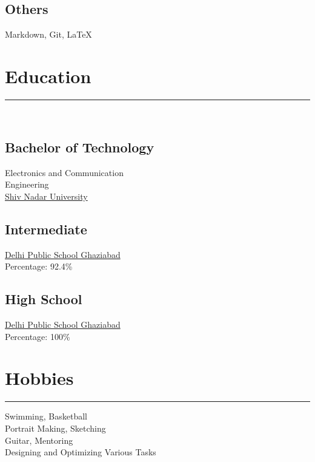 \documentclass[]{rahulworld-resume}
\begin{document}
\begin{minipage}[t]{0.33\textwidth}
\vspace{6pt}
\subsection{Others}
Markdown, Git, LaTeX
\sectionsep

\section{Education} 
\noindent\rule{5cm}{0.4pt}\\
\subsection{Bachelor of Technology }
Electronics and Communication \\ 
Engineering \\

\href{snu.edu.in}{Shiv Nadar University} \\
\vspace{8pt}
\subsection{Intermediate}
\href{https://www.dpsgs.org/ghaziabad/}{Delhi Public School Ghaziabad}\\
Percentage: 92.4\%\\
\vspace{8pt}
\subsection{High School}
\href{https://www.dpsgs.org/ghaziabad/}{Delhi Public School Ghaziabad}\\
Percentage: 100\%\\
\sectionsep


\section{Hobbies}
\noindent\rule{5cm}{0.4pt}

Swimming, Basketball \\
Portrait Making, Sketching \\
Guitar, Mentoring \\
Designing and Optimizing Various Tasks\\

\sectionsep

%
%

\end{minipage} 
\end{document}
